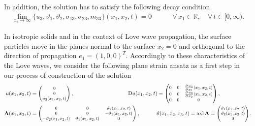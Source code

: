 \documentclass[10pt]{article}
\newcommand{\axl}{{\rm axl}}
\begin{document}
 

 In addition, the solution has to satisfy the following   decay condition
 \begin{align}\label{04}
 \lim_{x_2 \rightarrow \infty}\{u_3,{\vartheta_1}, \vartheta_2,\sigma_{13},\sigma_{23},m_{33}\} (x_1,x_2,t)=0 \qquad \quad \forall\, x_1\in\mathbb{R}, \quad \forall \, t\in[0,\infty).
 \end{align}
 
 
 
In isotropic solids and in the context of Love wave propagation, the surface particles move in the planes normal to the surface $x_2=0$ and  {orthogonal} to the direction of propagation  $e_1=(1,0,0)^T$. Accordingly to these characteristics of the Love waves, we consider the following   {plane} strain ansatz as a first step in our process of construction of the solution
 \begin{align}
 u(x_1,x_2,t)&=\begin{footnotesize}\begin{pmatrix} 0
 	\\
 	0
 	\\u_3(x_1,x_2,t)
 	\end{pmatrix}\end{footnotesize},\qquad \qquad \qquad\qquad \qquad{\rm D}u(x_1,x_2,t)=
 	\begin{footnotesize}\begin{pmatrix}
 	0 & 0 & \frac{\partial\, u_{3}}{\partial\,x_1}(x_1,x_2,t)\\
 	0 & 0 & \frac{\partial\, u_{3}}{\partial\,x_2}(x_1,x_2,t)\\
 	0 & 0 & 0
 	\end{pmatrix}\end{footnotesize}, \\ 
 	\mathbf{A}(x_1,x_2,t)&=
 	\begin{footnotesize}\begin{pmatrix}
 	0&0&\vartheta_2(x_1,x_2,t)\\
 	0&0&-\vartheta_1(x_1,x_2,t)\\
 	-\vartheta_2(x_1,x_2,t)&\vartheta_1(x_1,x_2,t)&0
 	\end{pmatrix}\end{footnotesize},\qquad \quad
 	\vartheta (x_1,x_2,x_3,t)=\axl \,\mathbf{A}=\begin{footnotesize}\begin{pmatrix} \vartheta   _1(x_1,x_2,t)
 	\\
 	\vartheta   _2(x_1,x_2,t)
 	\\ 0
 		\end{pmatrix}\end{footnotesize}.\notag
 \end{align}
 
\end{document}
